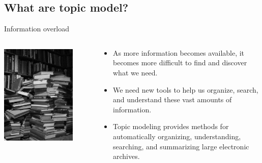 \documentclass[hyperref={unicode}]{beamer}
\begin{document}
\begin{CJK}{UTF8}{gkai}
\subsection{What are topic model?}
\begin{frame}{Information overload}
\begin{columns}
\begin{column}{0.5\textwidth}
  \begin{center}
    \includegraphics[width=0.8\textwidth]{overload}
  \end{center}
\end{column}
\begin{column}{0.5\textwidth}
  \begin{itemize}
  \item As more information becomes available, it becomes more \alert{difficult} to find and discover what we need.
    \pause
    \item We need new tools to help us \alert{organize}, search, and \alert{understand} these vast amounts of information.
      \pause
      \item Topic modeling provides methods for \alert{automatically organizing}, \alert{understanding}, searching, and summarizing large electronic archives.
  \end{itemize}
\end{column}
\end{columns}
\end{frame}


\end{CJK}
\end{document}
